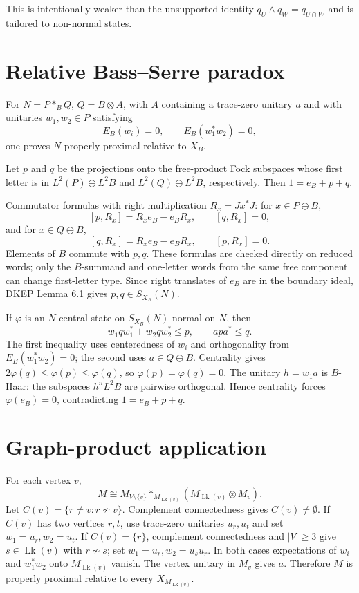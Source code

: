 \documentclass{article}
\DeclareMathOperator{\Lk}{Lk}
\begin{document}
This is intentionally weaker than the unsupported identity
$q_U\wedge q_W=q_{U\cap W}$ and is tailored to non-normal states.

\section*{Relative Bass--Serre paradox}

For $N=P*_BQ$, $Q=B\bar\otimes A$, with $A$ containing a trace-zero unitary $a$
and with unitaries $w_1,w_2\in P$ satisfying
\[
  E_B(w_i)=0,\qquad E_B(w_1^*w_2)=0,
\]
one proves $N$ properly proximal relative to $X_B$.

Let $p$ and $q$ be the projections onto the free-product Fock subspaces whose
first letter is in $L^2(P)\ominus L^2B$ and $L^2(Q)\ominus L^2B$, respectively.
Then $1=e_B+p+q$.

Commutator formulas with right multiplication $R_x=Jx^*J$:
for $x\in P\ominus B$,
\[
  [p,R_x]=R_xe_B-e_BR_x,\qquad [q,R_x]=0,
\]
and for $x\in Q\ominus B$,
\[
  [q,R_x]=R_xe_B-e_BR_x,\qquad [p,R_x]=0.
\]
Elements of $B$ commute with $p,q$.  These formulas are checked directly on
reduced words; only the $B$-summand and one-letter words from the same free
component can change first-letter type.  Since right translates of $e_B$ are in
the boundary ideal, DKEP Lemma 6.1 gives $p,q\in S_{X_B}(N)$.

If $\varphi$ is an $N$-central state on $S_{X_B}(N)$ normal on $N$, then
\[
  w_1qw_1^*+w_2qw_2^*\le p,\qquad apa^*\le q.
\]
The first inequality uses centeredness of $w_i$ and orthogonality from
$E_B(w_1^*w_2)=0$; the second uses $a\in Q\ominus B$.  Centrality gives
$2\varphi(q)\le\varphi(p)\le\varphi(q)$, so $\varphi(p)=\varphi(q)=0$.
The unitary $h=w_1a$ is $B$-Haar: the subspaces $h^nL^2B$ are pairwise
orthogonal.  Hence centrality forces $\varphi(e_B)=0$, contradicting
$1=e_B+p+q$.

\section*{Graph-product application}

For each vertex $v$,
\[
  M\cong M_{V\setminus\{v\}}*_{M_{\Lk(v)}}(M_{\Lk(v)}\bar\otimes M_v).
\]
Let $C(v)=\{r\ne v:r\not\sim v\}$.  Complement connectedness gives
$C(v)\ne\emptyset$.  If $C(v)$ has two vertices $r,t$, use trace-zero unitaries
$u_r,u_t$ and set $w_1=u_r,w_2=u_t$.  If $C(v)=\{r\}$, complement
connectedness and $|V|\ge3$ give $s\in\Lk(v)$ with $r\not\sim s$; set
$w_1=u_r,w_2=u_su_r$.  In both cases expectations of $w_i$ and $w_1^*w_2$ onto
$M_{\Lk(v)}$ vanish.  The vertex unitary in $M_v$ gives $a$.  Therefore $M$ is
properly proximal relative to every $X_{M_{\Lk(v)}}$.
\end{document}
